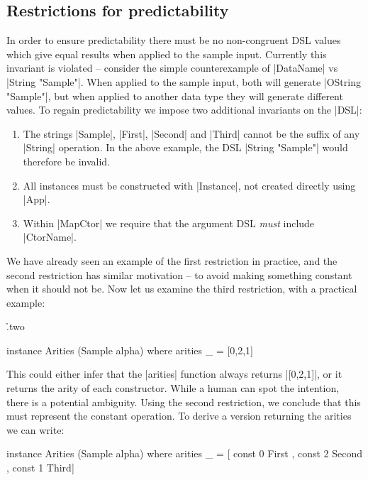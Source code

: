 \documentclass[preprint,draft]{sigplanconf}
\begin{document}
\subsection{Restrictions for predictability}
\label{sec:predictability}

In order to ensure predictability there must be no non-congruent DSL values which give equal results when applied to the sample input. Currently this invariant is violated -- consider the simple counterexample of |DataName| vs |String "Sample"|. When applied to the sample input, both will generate |OString "Sample"|, but when applied to another data  type they will generate different values. To regain predictability we impose two additional invariants on the |DSL|:

\begin{enumerate}
\item The strings |Sample|, |First|, |Second| and |Third| cannot be the suffix of any |String| operation. In the above example, the DSL |String "Sample"| would therefore be invalid.
\item All instances must be constructed with |Instance|, not created directly using |App|.
\item Within |MapCtor| we require that the argument DSL \textit{must} include |CtorName|.
\end{enumerate}

We have already seen an example of the first restriction in practice, and the second restriction has similar motivation -- to avoid making something constant when it should not be. Now let us examine the third restriction, with a practical example:

\h{.two}\begin{code}
instance Arities (Sample alpha) where
    arities _ = [0,2,1]
\end{code}

This could either infer that the |arities| function always returns |[0,2,1]|, or it returns the arity of each constructor. While a human can spot the intention, there is a potential ambiguity. Using the second restriction, we conclude that this must represent the constant operation. To derive a version returning the arities we can write:

\begin{code}
instance Arities (Sample alpha) where
    arities _ =  [  const 0 First{}
                 ,  const 2 Second{}
                 ,  const 1 Third{}]
\end{code}
\end{document}
